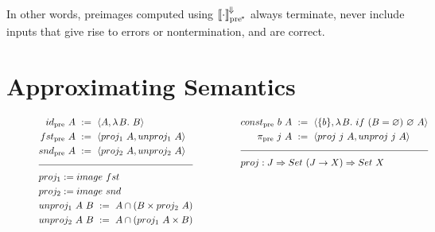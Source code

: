 \documentclass{llncs}
\newcommand{\smallmathfont}{\fontsize{7.5}{9}\selectfont}
\newcommand{\conv}{^{\mspace{-2mu}\Downarrow\mspace{-2mu}}}
\newcommand{\meaningofconv}[1]{\left\llbracket{#1}\right\rrbracket\conv}
\newcommand{\pre}{_\mathrm{pre}}
\newcommand{\ppre}{_\mathrm{pre^{\mspace{-2mu}*}}}
\begin{document}
In other words, preimages computed using $\meaningofconv{\cdot}\ppre$ always terminate, never include inputs that give rise to errors or nontermination, and are correct.


\section{Approximating Semantics}
\label{sec:approximating-semantics}

\begin{figure}[!tb]\centering
\smallmathfont
\begin{align*}
\begin{aligned}[t]
	&\begin{aligned}[t]
		id\pre~A &\ := \ \pair{A,\fun{B}{B}} \\
		fst\pre~A &\ := \ \pair{proj_1~A,unproj_1~A} \\
		snd\pre~A &\ := \ \pair{proj_2~A,unproj_2~A} \\
	\end{aligned} \\
\\[-8pt]
\hline
\\[-8pt]
	&\begin{aligned}[t]
		&proj_1 := image~fst \\
		&proj_2 := image~snd \\
		&unproj_1~A~B \ := \ A \i (B \times proj_2~A) \\
		&unproj_2~A~B \ := \ A \i (proj_1~A \times B)
	\end{aligned}
\end{aligned}
&\tab\tab\tab\tab\tab
\begin{aligned}[t]
	&\begin{aligned}[t]
		const\pre~b~A &\ := \ \pair{\set{b},\fun{B}{if~(B = \emptyset)~\emptyset~A}} \\
		\pi\pre~j~A &\ := \ \pair{proj~j~A, unproj~j~A}
	\end{aligned} \\
\\[-8pt]
\hline
\\[-8pt]
	&\begin{aligned}[t]
		&proj : J \tto Set~(J \to X) \tto Set~X \\

\end{aligned}
\end{aligned}
\end{align*}
\end{figure}
\end{document}

